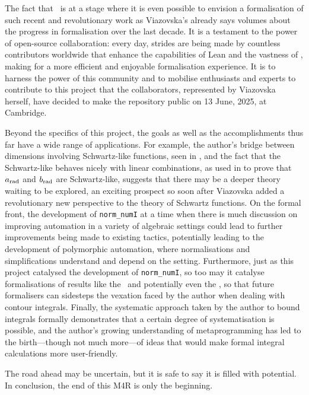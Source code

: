 
The fact that \mathlib\ is at a stage where it is even possible to envision a formalisation of such recent and revolutionary work as Viazovska's already says volumes about the progress in formalisation over the last decade. It is a testament to the power of open-source collaboration: every day, strides are being made by countless contributors worldwide that enhance the capabilities of Lean and the vastness of \mathlib, making for a more efficient and enjoyable formalisation experience. It is to harness the power of this community and to mobilise enthusiasts and experts to contribute to this project that the collaborators, represented by Viazovska herself, have decided to make the repository public on 13 June, 2025, at Cambridge.

Beyond the specifics of this project, the goals as well as the accomplishments thus far have a wide range of applications. For example, the author's bridge between dimensions involving Schwartz-like functions, seen in , and the fact that the Schwartz-like behaves nicely with linear combinations, as used in  to prove that $a_{\operatorname{rad}}$ and $b_{\operatorname{rad}}$ are Schwartz-like, suggests that there may be a deeper theory waiting to be explored, an exciting prospect so soon after Viazovska added a revolutionary new perspective to the theory of Schwartz functions. On the formal front, the development of \lstinline|norm_numI| at a time when there is much discussion on improving automation in a variety of algebraic settings could lead to further improvements being made to existing tactics, potentially leading to the development of polymorphic automation, where normalisations and simplifications understand and depend on the setting. Furthermore, just as this project catalysed the development of \lstinline|norm_numI|, so too may it catalyse formalisations of results like the \CGT\ and potentially even the \JCT, so that future formalisers can sidesteps the vexation faced by the author when dealing with contour integrals. Finally, the systematic approach taken by the author to bound integrals formally demonstrates that a certain degree of systematisation is possible, and the author's growing understanding of metaprogramming has led to the birth---though not much more---of ideas that would make formal integral calculations more user-friendly.

The road ahead may be uncertain, but it is safe to say it is filled with potential. In conclusion, the end of this M4R is only the beginning.